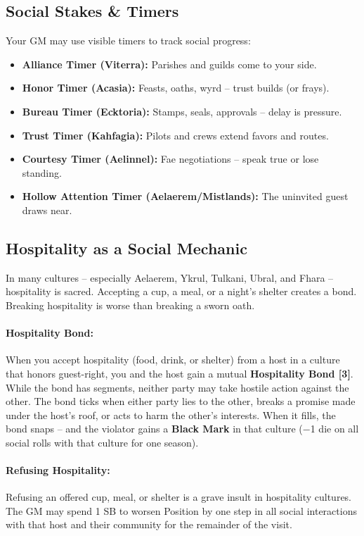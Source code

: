 \subsection*{Social Stakes \& Timers}
\label{sec:social-timers}
Your GM may use visible timers to track social progress:
\begin{itemize}
\item \textbf{Alliance Timer (Viterra):} Parishes and guilds come to your side.
\item \textbf{Honor Timer (Acasia):} Feasts, oaths, wyrd -- trust builds (or frays).
\item \textbf{Bureau Timer (Ecktoria):} Stamps, seals, approvals -- delay is pressure.
\item \textbf{Trust Timer (Kahfagia):} Pilots and crews extend favors and routes.
\item \textbf{Courtesy Timer (Aelinnel):} Fae negotiations -- speak true or lose standing.
\item \textbf{Hollow Attention Timer (Aelaerem/Mistlands):} The uninvited guest draws near.
\end{itemize}

\subsection*{Hospitality as a Social Mechanic}
\label{sec:hospitality}

In many cultures -- especially Aelaerem, Ykrul, Tulkani, Ubral, and Fhara -- hospitality is sacred. Accepting a cup, a meal, or a night's shelter creates a bond. Breaking hospitality is worse than breaking a sworn oath.

\paragraph{Hospitality Bond:} When you accept hospitality (food, drink, or shelter) from a host in a culture that honors guest-right, you and the host gain a mutual \textbf{Hospitality Bond [3]}. While the bond has segments, neither party may take hostile action against the other. The bond ticks when either party lies to the other, breaks a promise made under the host's roof, or acts to harm the other's interests. When it fills, the bond snaps -- and the violator gains a \textbf{Black Mark} in that culture (−1 die on all social rolls with that culture for one season).

\paragraph{Refusing Hospitality:} Refusing an offered cup, meal, or shelter is a grave insult in hospitality cultures. The GM may spend 1 SB to worsen Position by one step in all social interactions with that host and their community for the remainder of the visit.

